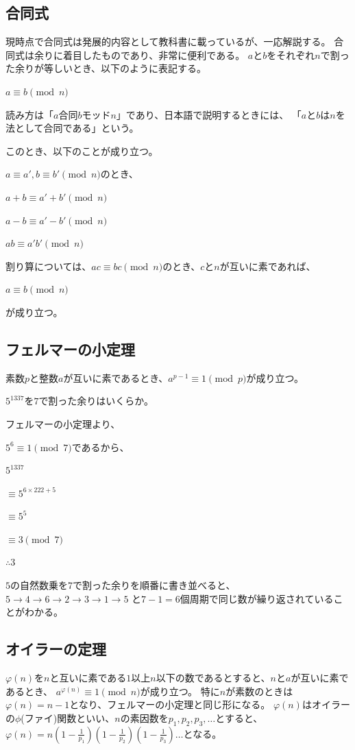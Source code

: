 \documentclass[uplatex,dvipdfmx]{jsbook}
\begin{document}
\subsection{合同式}
現時点で合同式は発展的内容として教科書に載っているが、一応解説する。
合同式は余りに着目したものであり、非常に便利である。
$a$と$b$をそれぞれ$n$で割った余りが等しいとき、以下のように表記する。

$a \equiv b \pmod n$

読み方は「$a$合同$b$モッド$n$」であり、日本語で説明するときには、
「$a$と$b$は$n$を法として合同である」という。

このとき、以下のことが成り立つ。

$a \equiv a', b \equiv b' \pmod n$のとき、

$a+b \equiv a'+b' \pmod n$

$a-b \equiv a'-b' \pmod n$

$ab \equiv a'b' \pmod n$

割り算については、$ac \equiv bc \pmod n$のとき、$c$と$n$が互いに素であれば、

$a \equiv b \pmod n$

が成り立つ。

\subsection{フェルマーの小定理}
素数$p$と整数$a$が互いに素であるとき、$a^{p-1}\equiv 1 \pmod p$が成り立つ。

\begin{problem}[例題]
    $5^{1337}$を$7$で割った余りはいくらか。

    フェルマーの小定理より、

    $5^6 \equiv 1 \pmod 7$であるから、

    $5^{1337}$

    $\equiv 5^{6\times 222 + 5}$

    $\equiv 5^5$

    $\equiv 3 \pmod 7$

    $\therefore 3$
\end{problem}

$5$の自然数乗を7で割った余りを順番に書き並べると、
$5 \rightarrow 4 \rightarrow 6 \rightarrow 2 \rightarrow 3 \rightarrow 1 \rightarrow 5$
と$7-1=6$個周期で同じ数が繰り返されていることがわかる。

\subsection{オイラーの定理}
$\varphi\left(n\right)$を$n$と互いに素である$1$以上$n$以下の数であるとすると、$n$と$a$が互いに素であるとき、
$a^{\varphi\left(n\right)} \equiv 1 \pmod n$が成り立つ。
特に$n$が素数のときは$\varphi\left(n\right)=n-1$となり、フェルマーの小定理と同じ形になる。
$\varphi(n)$はオイラーの$\phi$(ファイ)関数といい、$n$の素因数を$p_1,p_2,p_3,\dots$とすると、
$\displaystyle \varphi(n)=n\left(1-\frac{1}{p_1}\right)\left(1-\frac{1}{p_2}\right)\left(1-\frac{1}{p_3}\right)\dots$となる。
\end{document}
